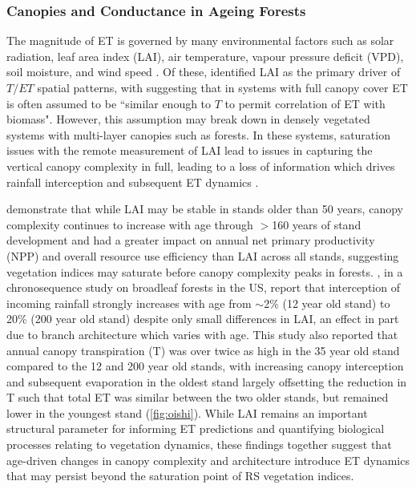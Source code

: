 \documentclass[paper=a4,fontsize=12pt]{scrartcl}
\begin{document}
\subsubsection{Canopies and Conductance in Ageing Forests}
The magnitude of ET is governed by many environmental factors such as solar radiation, leaf area index (LAI), air temperature, vapour pressure deficit (VPD), soil moisture, and wind speed \parencite{yang2023evapotranspiration}. Of these, \textcite{lian2018partitioning} identified LAI as the primary driver of $T/ET$ spatial patterns, with \textcite{kool2014review} suggesting that in systems with full canopy cover ET is often assumed to be ``similar enough to $T$ to permit correlation of ET with biomass". However, this assumption may break down in densely vegetated systems with multi-layer canopies such as forests. In these systems, saturation issues with the remote measurement of LAI lead to issues in capturing the vertical canopy complexity in full, leading to a loss of information which drives rainfall interception and subsequent ET dynamics \parencite{wang2022combining}.
\par \textcite{hardiman2013maintaining} demonstrate that while LAI may be stable in stands older than 50 years, canopy complexity continues to increase with age through $>$160 years of stand development and had a greater impact on annual net primary productivity (NPP) and overall resource use efficiency than LAI across all stands, suggesting vegetation indices may saturate before canopy complexity peaks in forests. \textcite{oishi2020quantifying}, in a chronosequence study on broadleaf forests in the US, report that interception of incoming rainfall strongly increases with age from $\sim$2\% (12 year old stand) to 20\% (200 year old stand) despite only small differences in LAI, an effect in part due to branch architecture which varies with age. This study also reported that annual canopy transpiration (T) was over twice as high in the 35 year old stand compared to the 12 and 200 year old stands, with increasing canopy interception and subsequent evaporation in the oldest stand largely offsetting the reduction in T such that total ET was similar between the two older stands, but remained lower in the youngest stand (\autoref{fig:oishi}). While LAI remains an important structural parameter for informing ET predictions and quantifying biological processes relating to vegetation dynamics, these findings together suggest that age-driven changes in canopy complexity and architecture introduce ET dynamics that may persist beyond the saturation point of RS vegetation indices.
\end{document}
